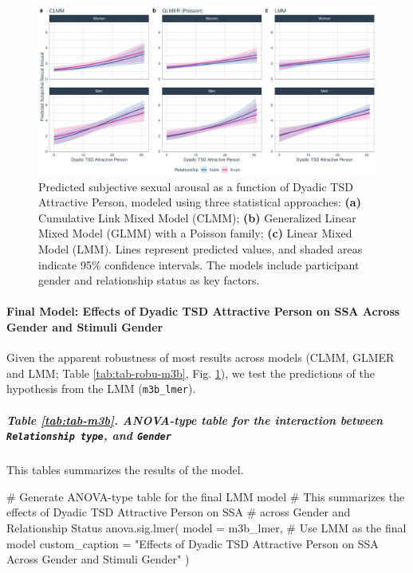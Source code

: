 \documentclass[
  bookmarksnumbered]{article}
\newenvironment{Shaded}{\begin{snugshade}}{\end{snugshade}}
\newcommand{\AttributeTok}[1]{\textcolor[rgb]{0.80,0.80,0.80}{#1}}
\newcommand{\CommentTok}[1]{\textcolor[rgb]{0.50,0.62,0.50}{#1}}
\newcommand{\FunctionTok}[1]{\textcolor[rgb]{0.94,0.94,0.56}{#1}}
\newcommand{\NormalTok}[1]{\textcolor[rgb]{0.80,0.80,0.80}{#1}}
\newcommand{\StringTok}[1]{\textcolor[rgb]{0.80,0.58,0.58}{#1}}
\begin{document}
\begin{figure}
\centering
\includegraphics{Sexual_Desire_Arousal_files/figure-latex/preds-m3b-1.pdf}
\caption{\label{fig:preds-m3b}Predicted subjective sexual arousal as a function of Dyadic TSD Attractive Person, modeled using three statistical approaches: \textbf{(a)} Cumulative Link Mixed Model (CLMM); \textbf{(b)} Generalized Linear Mixed Model (GLMM) with a Poisson family; \textbf{(c)} Linear Mixed Model (LMM). Lines represent predicted values, and shaded areas indicate 95\% confidence intervals. The models include participant gender and relationship status as key factors.}
\end{figure}

\paragraph{Final Model: Effects of Dyadic TSD Attractive Person on SSA Across Gender and Stimuli Gender}\label{final-model-effects-of-dyadic-tsd-attractive-person-on-ssa-across-gender-and-stimuli-gender-1}

Given the apparent robustness of most results across models (CLMM, GLMER and LMM; Table \ref{tab:tab-robu-m3b}, Fig. \ref{fig:preds-m3b}), we test the predictions of the hypothesis from the LMM (\texttt{m3b\_lmer}).

\subparagraph{\texorpdfstring{Table \ref{tab:tab-m3b}. ANOVA-type table for the interaction between \texttt{Relationship\ type}, and \texttt{Gender}}{Table \ref{tab:tab-m3b}. ANOVA-type table for the interaction between Relationship type, and Gender}}\label{table-reftabtab-m3b.-anova-type-table-for-the-interaction-between-relationship-type-and-gender}

This tables summarizes the results of the model.

\begin{Shaded}
\begin{Highlighting}[]
\CommentTok{\# Generate ANOVA{-}type table for the final LMM model}
\CommentTok{\# This summarizes the effects of Dyadic TSD Attractive Person on SSA}
\CommentTok{\# across Gender and Relationship Status}
\FunctionTok{anova.sig.lmer}\NormalTok{(}
  \AttributeTok{model =}\NormalTok{ m3b\_lmer, }\CommentTok{\# Use LMM as the final model}
  \AttributeTok{custom\_caption =} \StringTok{"Effects of Dyadic TSD Attractive Person on SSA }
\StringTok{  Across Gender and Stimuli Gender"}
\NormalTok{)}
\end{Highlighting}
\end{Shaded}
\end{document}
